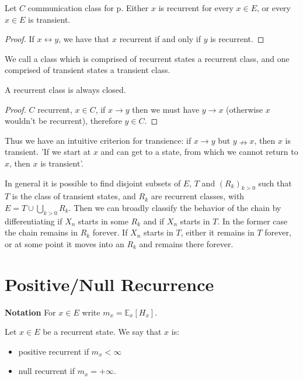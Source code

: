 \begin{cor}[]
	Let $C$ communication class for p. Either $x$ is recurrent for every $x \in E$, or every $x \in E$ is transient.
\end{cor}
\begin{proof}
	If $x  \leftrightarrow y $, we have that $x$ recurrent if and only if $y$ is recurrent.
\end{proof}
\begin{rmk}[]
	\color{blue}	We call a class which is comprised of recurrent states a recurrent class, and one comprised of transient states a transient class.
\end{rmk}


\begin{cor}[]
	A recurrent class is always closed.
\end{cor}
\begin{proof}
	$C$ recurrent, $x \in C$, if $x \to y$ then we must have $y \to x$ (otherwise $x$ wouldn't be recurrent), therefore $y \in C$.
\end{proof}
\begin{cor}[]
	Thus we have an {\color{blue}intuitive} criterion for transience: if $x \to y$ but $y  \nrightarrow x$, then $x$ is transient. {\color{blue}'If we start at  $x$ and can get to a state, from which we cannot return to $x$, then $x$ is transient'.}
\end{cor}

\begin{rmk}[]
	In general it is possible to find disjoint subsets of $E$, $T$ and $(R_k)_{k> 0}$ such that $T$ is the class of transient states, and $R_k$ are recurrent classes, with $E = T \cup \bigcup_{k> 0}R_k$. {\color{blue}Then we can broadly classify the behavior of the chain by differentiating} if $X_n$ starts in some $R_k$ and if $X_n$ starts in $T$. In the former case the chain remains in $R_k$ {\color{blue}forever}. If $X_n$ starts in $T$, either it remains in $T$ {\color{blue}forever}, or at some point it moves into an $R_k$ and remains there {\color{blue}forever}.
\end{rmk}


\section{Positive/Null Recurrence}
\textbf{Notation} For $x \in E$ write $m_{x}=\mathbb{E}_{x} \left[ H_x \right] $.

\begin{defn}
	Let $x \in E$ be a recurrent state. We say that $x$ is:
\begin{itemize}
	\item positive recurrent if $\boxed{m_x<\infty}$ 
	\item null recurrent if $\boxed{m_x=+\infty}$.
\end{itemize}

\end{defn}

